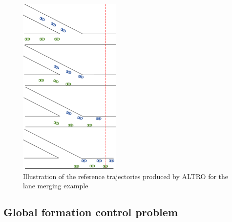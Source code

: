 %


\begin{figure}
	\caption{Illustration of the reference trajectories produced by ALTRO for the lane merging example}
	\label{fig:merge}
	\centering
	\includegraphics[width=0.45\textwidth,height=0.5\textheight]{figures/merge2.png}

\end{figure}


\subsection{Global formation control problem}

